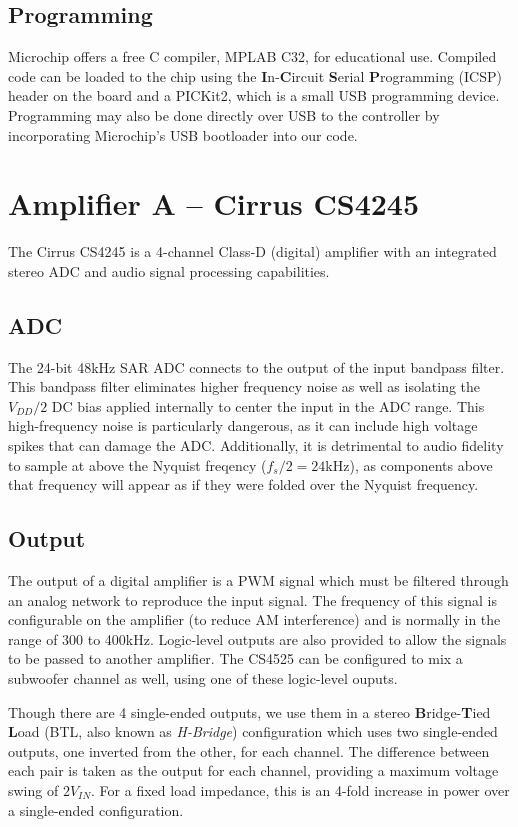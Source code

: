 \subsection{Programming}
Microchip offers a free C compiler, MPLAB C32, for educational use. Compiled code can be loaded to the chip using the \textbf{I}n-\textbf{C}ircuit \textbf{S}erial \textbf{P}rogramming (ICSP) header on the board and a PICKit2, which is a small USB programming device. Programming may also be done directly over USB to the controller by incorporating Microchip's USB bootloader into our code.

\section{Amplifier A -- Cirrus CS4245}
The Cirrus CS4245 is a 4-channel Class-D (digital) amplifier with an integrated stereo ADC and audio signal processing capabilities.
\subsection{ADC}
The 24-bit 48kHz SAR ADC connects to the output of the input bandpass filter. This bandpass filter eliminates higher frequency noise as well as isolating the $V_{DD}/2$ DC bias applied internally to center the input in the ADC range. This high-frequency noise is particularly dangerous, as it can include high voltage spikes that can damage the ADC. Additionally, it is detrimental to audio fidelity to sample at above the Nyquist freqency ($f_s/2 = 24$kHz), as components above that frequency will appear as if they were folded over the Nyquist frequency.
\subsection{Output}
The output of a digital amplifier is a PWM signal which must be filtered through an analog network to reproduce the input signal. The frequency of this signal is configurable on the amplifier (to reduce AM interference) and is normally in the range of 300 to 400kHz. Logic-level outputs are also provided to allow the signals to be passed to another amplifier. The CS4525 can be configured to mix a subwoofer channel as well, using one of these logic-level ouputs.

Though there are 4 single-ended outputs, we use them in a stereo \textbf{B}ridge-\textbf{T}ied \textbf{L}oad (BTL, also known as \textit{H-Bridge}) configuration which uses two single-ended outputs, one inverted from the other, for each channel. The difference between each pair is taken as the output for each channel, providing a maximum voltage swing of $2V_{IN}$. For a fixed load impedance, this is an 4-fold increase in power over a single-ended configuration.
